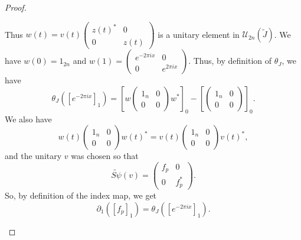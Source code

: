 \documentclass{book}
\begin{document}
\begin{proof}
\begin{enumerate}
    Thus \(w(t)=v(t)\begin{pmatrix}
      {z(t)}^*&0\\0&z(t)
    \end{pmatrix}\) is a unitary element in \(\mathcal{U}_{2n}(\tilde{J})\). We have \(w(0)=1_{2n}\) and 
    \(w(1)=\begin{pmatrix}
      e^{-2\pi ix}&0\\0&e^{2\pi ix}
    \end{pmatrix}\). Thus, by definition of \(\theta_J\), we have
    \begin{equation}
      \theta_J({[e^{-2\pi ix}]}_1)={\left[w\begin{pmatrix}
        1_n&0\\0&0
      \end{pmatrix}w^*\right]}_0
      -{\left[\begin{pmatrix}
        1_n&0\\0&0
      \end{pmatrix}\right]}_0.
    \end{equation}
    We also have
    \begin{equation}
      w(t)\begin{pmatrix}
        1_n&0\\0&0
      \end{pmatrix}
      {w(t)}^*=v(t)\begin{pmatrix}
        1_n&0\\0&0
      \end{pmatrix}
      {v(t)}^*,
    \end{equation}
    and the unitary \(v\) was chosen so that 
    \begin{equation}
      \widetilde{S\psi}(v)=\begin{pmatrix}
        f_p&0\\0&f_p^*
      \end{pmatrix}.
    \end{equation}
    So, by definition of the index map, we get
    \begin{equation}
      \partial_1({[f_p]}_1)=\theta_J({[e^{-2\pi ix}]}_1).
    \end{equation}
  \end{enumerate}
\end{proof}
\end{document}
